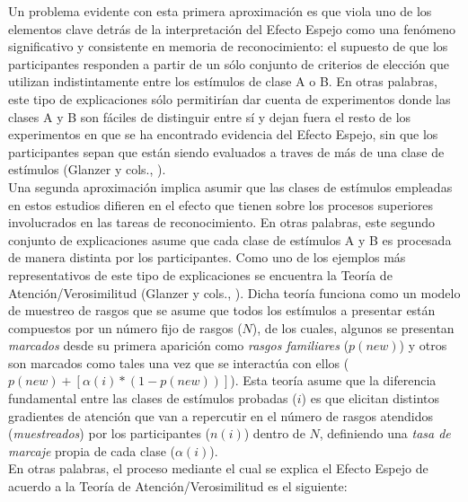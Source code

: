 Un problema evidente con esta primera aproximación es que viola uno de los elementos clave detrás de la interpretación del Efecto Espejo como una fenómeno significativo y consistente en memoria de reconocimiento: el supuesto de que los participantes responden a partir de un sólo conjunto de criterios de elección que utilizan indistintamente entre los estímulos de clase A o B. En otras palabras, este tipo de explicaciones sólo permitirían dar cuenta de experimentos donde las clases A y B son fáciles de distinguir entre sí y dejan fuera el resto de los experimentos en que se ha encontrado evidencia del Efecto Espejo, sin que los participantes sepan que están siendo evaluados a traves de más de una clase de estímulos (Glanzer y cols., \citeyear{Glanzer1998}).\\

Una segunda aproximación implica asumir que las clases de estímulos empleadas en estos estudios difieren en el efecto que tienen sobre los procesos superiores involucrados en las tareas de reconocimiento. En otras palabras, este segundo conjunto de explicaciones asume que cada clase de estímulos A y B es procesada de manera distinta por los participantes. Como uno de los ejemplos más representativos de este tipo de explicaciones se encuentra la Teoría de Atención/Verosimilitud (Glanzer y cols., \citeyear{Glanzer1993}). Dicha teoría funciona como un modelo de muestreo de rasgos que se asume que todos los estímulos a presentar están compuestos por un número fijo de rasgos ($N$), de los cuales, algunos se presentan \textit{marcados} desde su primera aparición como \textit{rasgos familiares} ($p(new)$) y otros son marcados como tales una vez que se interactúa con ellos ($p(new) + [\alpha(i)* (1-p(new))]$). Esta teoría asume que la diferencia fundamental entre  las clases de estímulos probadas ($i$) es que elicitan distintos gradientes de atención que van a repercutir en el número de rasgos atendidos (\textit{muestreados}) por los participantes ($n(i)$) dentro de $N$, definiendo una \textit{tasa de marcaje} propia de cada clase ($\alpha(i)$).\\

\pagebreak
En otras palabras, el proceso mediante el cual se explica el Efecto Espejo de acuerdo a la Teoría de Atención/Verosimilitud es el siguiente:\\

